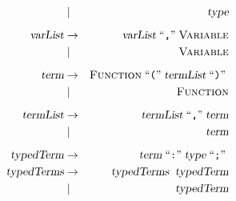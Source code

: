 \documentclass{slides}
\newcommand{\quoted}[1]{\;\mbox{``\texttt{#1}''}\;}
\begin{document}
\begin{slide}{}
\begin{eqnarray*}
                         & \mid        & \textsl{type}                  \\[0.2cm]
    \textsl{varList}     & \rightarrow & \textsl{varList} \quoted{,} \textsc{Variable} \\[0.0cm]
                         & \mid        & \textsc{Variable}                 \\[0.2cm]
    \textsl{term}        & \rightarrow & \textsc{Function} \quoted{(} \textsl{termList} \quoted{)} \\[0.0cm]
                         & \mid        & \textsc{Function}    \\[0.2cm]
    \textsl{termList}    & \rightarrow & \textsl{termList} \quoted{,} \textsl{term} \\[0.0cm]
                         & \mid        & \textsl{term}                  \\[0.2cm]
    \textsl{typedTerm}   & \rightarrow & \textsl{term} \quoted{:} \textsl{type} \quoted{;} \\[0.0cm]    
    \textsl{typedTerms}  & \rightarrow & \textsl{typedTerms}  \;\;\textsl{typedTerm} \\[0.0cm]
                         & \mid        & \textsl{typedTerm}             
  \end{eqnarray*}

\end{slide}
\end{document}

